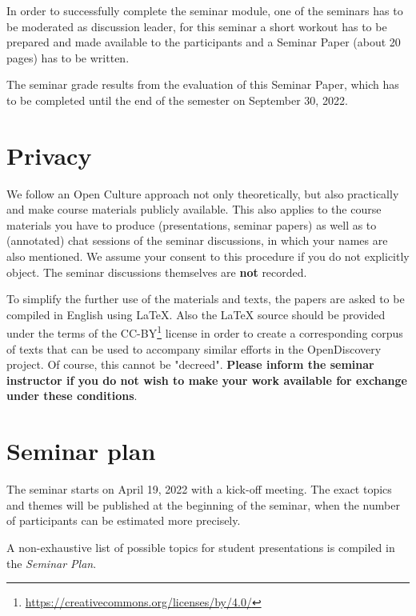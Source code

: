 \documentclass[11pt,a4paper]{article}
\begin{document}
In order to successfully complete the seminar module, one of the seminars has
to be moderated as discussion leader, for this seminar a short workout has to
be prepared and made available to the participants and a Seminar Paper (about
20 pages) has to be written.

The seminar grade results from the evaluation of this Seminar Paper, which has
to be completed until the end of the semester on September 30, 2022.

\section{Privacy}

We follow an Open Culture approach not only theoretically, but also
practically and make course materials publicly available.  This also applies
to the course materials you have to produce (presentations, seminar papers) as
well as to (annotated) chat sessions of the seminar discussions, in which your
names are also mentioned.  We assume your consent to this procedure if you do
not explicitly object.  The seminar discussions themselves are \textbf{not}
recorded.

To simplify the further use of the materials and texts, the papers are asked
to be compiled in English using {\LaTeX}.  Also the {\LaTeX} source should be
provided under the terms of the
CC-BY\footnote{\url{https://creativecommons.org/licenses/by/4.0/}} license in
order to create a corresponding corpus of texts that can be used to accompany
similar efforts in the OpenDiscovery project. Of course, this cannot be
"decreed". \textbf{Please inform the seminar instructor if you do not wish to
  make your work available for exchange under these conditions}.

\section{Seminar plan}

The seminar starts on April 19, 2022 with a kick-off meeting.  The exact
topics and themes will be published at the beginning of the seminar, when the
number of participants can be estimated more precisely.

A non-exhaustive list of possible topics for student presentations is compiled
in the \emph{Seminar Plan}.
\end{document}
